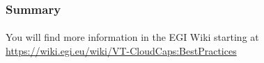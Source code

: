 \begin{frame}
\frametitle{Summary}
\framesubtitle{}
You will find more information in the EGI Wiki starting at \url{https://wiki.egi.eu/wiki/VT-CloudCaps:BestPractices}
\end{frame}


